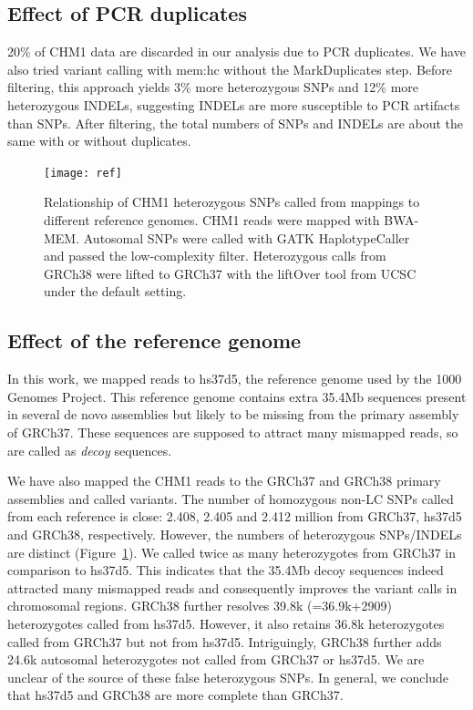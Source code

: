 \documentclass{bioinfo-ori}
\begin{document}
\subsection{Effect of PCR duplicates}
20\% of CHM1 data are discarded in our analysis due to PCR duplicates. We have
also tried variant calling with mem:hc without the MarkDuplicates step. Before
filtering, this approach yields 3\% more heterozygous SNPs and 12\% more
heterozygous INDELs, suggesting INDELs are more susceptible to PCR artifacts
than SNPs. After filtering, the total numbers of SNPs and INDELs are about the
same with or without duplicates.

\begin{figure}[!hbtp]
\centering
\texttt{[image: ref]}
\caption{Relationship of CHM1 heterozygous SNPs called from mappings to
different reference genomes. CHM1 reads were mapped with BWA-MEM. Autosomal
SNPs were called with GATK HaplotypeCaller and passed the low-complexity
filter. Heterozygous calls from GRCh38 were lifted to GRCh37 with the liftOver
tool from UCSC under the default setting.}\label{fig:ref}
\end{figure}

\subsection{Effect of the reference genome}\label{sec:ref}
In this work, we mapped reads to hs37d5, the reference genome used by the 1000
Genomes Project. This reference genome contains extra 35.4Mb sequences present
in several de novo assemblies but likely to be missing from the primary
assembly of GRCh37. These sequences are supposed to attract many mismapped
reads, so are called as \emph{decoy} sequences.

We have also mapped the CHM1 reads to the GRCh37 and GRCh38 primary assemblies
and called variants. The number of homozygous non-LC SNPs called from each
reference is close: 2.408, 2.405 and 2.412 million from GRCh37, hs37d5 and
GRCh38, respectively. However, the numbers of heterozygous SNPs/INDELs are
distinct (Figure~\ref{fig:ref}).  We called twice as many heterozygotes from
GRCh37 in comparison to hs37d5.  This indicates that the 35.4Mb decoy sequences
indeed attracted many mismapped reads and consequently improves the variant
calls in chromosomal regions.  GRCh38 further resolves 39.8k (=36.9k+2909)
heterozygotes called from hs37d5.  However, it also retains 36.8k heterozygotes
called from GRCh37 but not from hs37d5. Intriguingly, GRCh38 further adds 24.6k
autosomal heterozygotes not called from GRCh37 or hs37d5. We are unclear of the
source of these false heterozygous SNPs. In general, we conclude that hs37d5
and GRCh38 are more complete than GRCh37.
\end{document}
